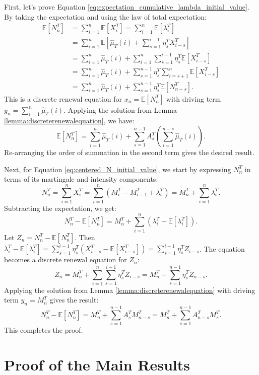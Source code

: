 \documentclass[letterpaper]{article}
\numberwithin{equation}{section}
\theoremstyle{definition}
\theoremstyle{remark}
\begin{document}
First, let's prove Equation \eqref{eq:expectation_cumulative_lambda_initial_value}. By taking the expectation and using the law of total expectation:
\begin{align*}
    \mathbb{E}[N_n^T] &= \sum_{i=1}^n \mathbb{E}[X_i^T] = \sum_{i=1}^n \mathbb{E}[\lambda_i^T] \\
    &= \sum_{i=1}^n \mathbb{E}\left[ \hat{\mu}_T(i) + \sum_{s=1}^{i-1} \eta_{s}^T X_{i-s}^T \right] \\
    &= \sum_{i=1}^n \hat{\mu}_T(i) + \sum_{i=1}^n \sum_{s=1}^{i-1} \eta_s^T \mathbb{E}[X_{i-s}^T] \\
    &= \sum_{i=1}^n \hat{\mu}_T(i) + \sum_{s=1}^{n-1} \eta_s^T \sum_{i=s+1}^n \mathbb{E}[X_{i-s}^T] \\
    &= \sum_{i=1}^n \hat{\mu}_T(i) + \sum_{s=1}^{n-1} \eta_s^T \mathbb{E}[N_{n-s}^T].
\end{align*}
This is a discrete renewal equation for $x_n = \mathbb{E}[N_n^T]$ with driving term $y_n = \sum_{i=1}^n \hat{\mu}_T(i)$. Applying the solution from Lemma \ref{lemma:discreterenewalequation}, we have:
\[
    \mathbb{E}[N_n^T] = \sum_{i=1}^n \hat{\mu}_T(i) + \sum_{s=1}^{n-1} A_s^T \left( \sum_{i=1}^{n-s} \hat{\mu}_T(i) \right).
\]
Re-arranging the order of summation in the second term gives the desired result.

Next, for Equation \eqref{eq:centered_N_initial_value}, we start by expressing $N_n^T$ in terms of its martingale and intensity components:
\[
    N_n^T = \sum_{i=1}^n X_i^T = \sum_{i=1}^n (M_i^T - M_{i-1}^T + \lambda_i^T) = M_n^T + \sum_{i=1}^n \lambda_i^T.
\]
Subtracting the expectation, we get:
\[
    N_n^T - \mathbb{E}[N_n^T] = M_n^T + \sum_{i=1}^n (\lambda_i^T - \mathbb{E}[\lambda_i^T]).
\]
Let $Z_n = N_n^T - \mathbb{E}[N_n^T]$. Then $\lambda_i^T - \mathbb{E}[\lambda_i^T] = \sum_{s=1}^{i-1} \eta_s^T (X_{i-s}^T - \mathbb{E}[X_{i-s}^T]) = \sum_{s=1}^{i-1} \eta_s^T Z_{i-s}$.
The equation becomes a discrete renewal equation for $Z_n$:
\[
    Z_n = M_n^T + \sum_{i=1}^n \sum_{s=1}^{i-1} \eta_s^T Z_{i-s} = M_n^T + \sum_{s=1}^{n-1} \eta_s^T Z_{n-s}.
\]
Applying the solution from Lemma \ref{lemma:discreterenewalequation} with driving term $y_n = M_n^T$ gives the result:
\[
    N_n^T - \mathbb{E}[N_n^T] = M_n^T + \sum_{s=1}^{n-1} A_{s}^T M_{n-s}^T = M_n^T + \sum_{s=1}^{n-1} A_{n-s}^T M_s^T.
\]
This completes the proof.


\section{Proof of the Main Results}
\label{sec:proofofthemainresults}
\end{document}
